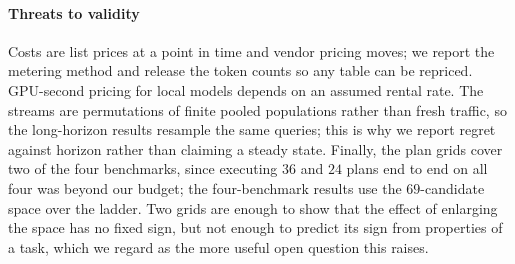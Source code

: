 \paragraph{Threats to validity}
Costs are list prices at a point in time and vendor pricing moves; we
report the metering method and release the token counts so any table can
be repriced. GPU-second pricing for local models depends on an assumed
rental rate. The streams are permutations of finite pooled populations
rather than fresh traffic, so the long-horizon results resample the same
queries; this is why we report regret against horizon rather than
claiming a steady state. Finally, the plan grids cover two of the four
benchmarks, since executing $36$ and $24$ plans end to end on all four
was beyond our budget; the four-benchmark results use the
$69$-candidate space over the ladder. Two grids are enough to show that
the effect of enlarging the space has no fixed sign, but not enough to
predict its sign from properties of a task, which we regard as the more
useful open question this raises.
